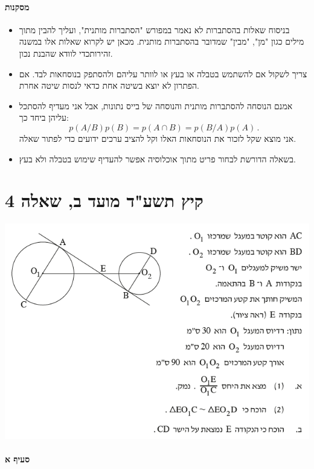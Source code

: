 \documentclass[12pt,a4paper]{article}
\begin{document}
\vspace{-1ex}\paragraph{מסקנות}

\begin{itemize}
\item
בניסוח שאלות בהסתברות לא נאמר במפורש "הסתברות מותנית", ועליך להבין מתוך מילים כגון "מן", "מבין" שמדובר בהסתברות מותנית. מכאן יש לקרוא שאלות אלו במשנה זהירותכדי לוודא שהבנת נכון.
\item
צריך לשקול אם להשתמש בטבלה או בעץ או לוותר עליהם ולהסתפק בנוסחאות לבד. אם הפתרון לא יוצא בשיטה אחת כדאי לנסות שיטה אחרת.
\item
אמנם הנוסחה להסתברות מותנית והנוסחה של בייס נתונות, אבל אני מעדיף להסתכל עליהן ביחד כך:
\[
p(A / B) p(B) = p(A\cap B) = p(B/A) p(A)\,.
\]
אני מוצא שקל לזכור את הנוסחאות האלו וקל להציב ערכים ידועים כדי לפתור שאלה.
\item
בשאלה הדורשת לבחור פריט מתוך אוכלוסיה אפשר להעדיף שימוש בטבלה ולא בעץ.
\end{itemize}

\newpage


\section*{קיץ תשע"ד מועד ב, שאלה 4}

\begin{center}
\includegraphics[width=.8\textwidth]{summer-2014b-4}
\end{center}

\vspace{-4ex}\paragraph{סעיף א}
\end{document}

